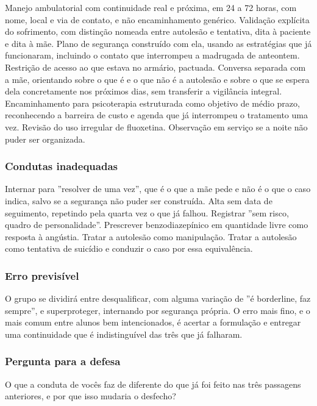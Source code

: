 Manejo ambulatorial com continuidade real e próxima, em 24 a 72 horas, com nome, local e via de contato, e não encaminhamento genérico. Validação explícita do sofrimento, com distinção nomeada entre autolesão e tentativa, dita à paciente e dita à mãe. Plano de segurança construído com ela, usando as estratégias que já funcionaram, incluindo o contato que interrompeu a madrugada de anteontem. Restrição de acesso ao que estava no armário, pactuada. Conversa separada com a mãe, orientando sobre o que é e o que não é a autolesão e sobre o que se espera dela concretamente nos próximos dias, sem transferir a vigilância integral. Encaminhamento para psicoterapia estruturada como objetivo de médio prazo, reconhecendo a barreira de custo e agenda que já interrompeu o tratamento uma vez. Revisão do uso irregular de fluoxetina. Observação em serviço se a noite não puder ser organizada.

\subsubsection*{Condutas inadequadas}

Internar para ''resolver de uma vez'', que é o que a mãe pede e não é o que o caso indica, salvo se a segurança não puder ser construída. Alta sem data de seguimento, repetindo pela quarta vez o que já falhou. Registrar ''sem risco, quadro de personalidade''. Prescrever benzodiazepínico em quantidade livre como resposta à angústia. Tratar a autolesão como manipulação. Tratar a autolesão como tentativa de suicídio e conduzir o caso por essa equivalência.

\subsubsection*{Erro previsível}

O grupo se dividirá entre desqualificar, com alguma variação de ''é borderline, faz sempre'', e superproteger, internando por segurança própria. O erro mais fino, e o mais comum entre alunos bem intencionados, é acertar a formulação e entregar uma continuidade que é indistinguível das três que já falharam.

\subsubsection*{Pergunta para a defesa}

O que a conduta de vocês faz de diferente do que já foi feito nas três passagens anteriores, e por que isso mudaria o desfecho?

